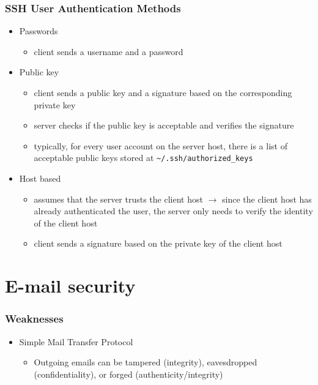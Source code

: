 \documentclass[final]{article}
\begin{document}
\subsubsection*{SSH User Authentication Methods}
\begin{itemize}[nosep]
    \item Passwords
          \begin{itemize}[nosep]
              \item client sends a username and a password
          \end{itemize}
    \item Public key
          \begin{itemize}[nosep]
              \item client sends a public key and a signature based on the corresponding private key
              \item server checks if the public key is acceptable and verifies the signature
              \item typically, for every user account on the server host, there is a list of acceptable public keys stored at \texttt{\~{}/.ssh/authorized\_keys}
          \end{itemize}
    \item Host based
          \begin{itemize}[nosep]
              \item assumes that the server trusts the client host $\rightarrow$ since the client host has already authenticated the user, the server only needs to verify the identity of the client host
              \item client sends a signature based on the private key of the client host
          \end{itemize}
\end{itemize}
\section{E-mail security}
\subsubsection*{Weaknesses}
\begin{itemize}[nosep]
    \item Simple Mail Transfer Protocol
          \begin{itemize}[nosep]
              \item Outgoing emails can be tampered (integrity), eavesdropped (confidentiality), or forged (authenticity/integrity)
          \end{itemize}
\end{itemize}
\end{document}
